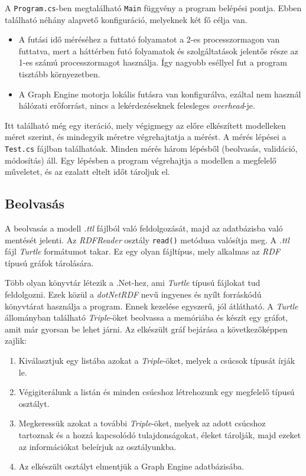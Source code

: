 A \texttt{Program.cs}-ben megtalálható \texttt{Main} függvény a program belépési pontja. Ebben található néhány alapvető konfiguráció, melyeknek két fő célja van.
\begin{itemize}
	\item A futási idő méréséhez a futtató folyamatot a 2-es processzormagon van futtatva, mert a háttérben futó folyamatok és szolgáltatások jelentős része az 1-es számú processzormagot használja. Így nagyobb eséllyel fut a program tisztább környezetben.
	\item A Graph Engine motorja lokális futásra van konfigurálva, ezáltal nem használ hálózati erőforrást, nincs a lekérdezéseknek felesleges \emph{overhead}-je.
\end{itemize}

Itt található még egy iteráció, mely végigmegy az előre elkészített modelleken méret szerint, és mindegyik méretre végrehajtatja a mérést. A mérés lépései a \texttt{Test.cs} fájlban találhatóak. Minden mérés három lépésből (beolvasás, validáció, módosítás) áll. Egy lépésben a program végrehajtja a modellen a megfelelő műveletet, és az ezalatt eltelt időt tároljuk el.

\subsection{Beolvasás}

A beolvasás a modell \emph{.ttl} fájlból való feldolgozását, majd az adatbázisba való mentését jelenti. Az \emph{RDFReader} osztály \texttt{read()} metódusa valósítja meg. A \emph{.ttl} fájl \emph{Turtle} formátumot takar. Ez egy olyan fájltípus, mely alkalmas az \emph{RDF} típusú gráfok tárolására. 

Több olyan könyvtár létezik a .Net-hez, ami \emph{Turtle} típusú fájlokat tud feldolgozni.\cite{RDFSharp}\cite{SemWeb} Ezek közül a \emph{dotNetRDF}\cite{dotNetRDF} nevű ingyenes és nyílt forráskódú könyvtárat használja a program. Ennek kezelése egyszerű, jól átlátható. A \emph{Turtle} állományban található \emph{Triple}-öket beolvassa a memóriába és készít egy gráfot, amit már gyorsan be lehet járni. Az elkészült gráf bejárása a következőképpen zajlik:

\begin{enumerate}
	\item Kiválasztjuk egy listába azokat a \emph{Triple}-öket, melyek a csúcsok típusát írják le.
	\item Végigiterálunk a listán és minden csúcshoz létrehozunk egy megfelelő típusú osztályt.
	\item Megkeressük azokat a további \emph{Triple}-öket, melyek az adott csúcshoz tartoznak és a hozzá kapcsolódó tulajdonságokat, éleket tárolják, majd ezeket az információkat beleírjuk az osztályunkba.
	\item Az elkészült osztályt elmentjük a Graph Engine adatbázisába.
\end{enumerate}

